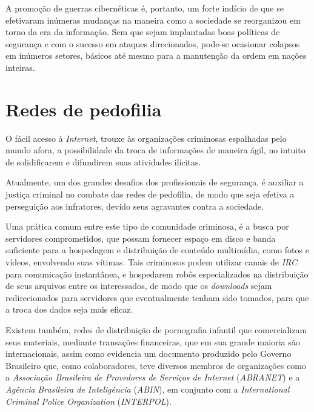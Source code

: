 A promoção de guerras cibernéticas é, portanto, um forte indício de que se efetivaram inúmeras mudanças na maneira como a sociedade se reorganizou em torno da era da informação. Sem que sejam implantadas boas políticas de segurança e com o sucesso em ataques direcionados, pode-se ocasionar colapsos em inúmeros setores, básicos até mesmo para a manutenção da ordem em nações inteiras.


\section{Redes de pedofilia}

O fácil acesso à \textit{Internet}, trouxe às organizações criminosas espalhadas pelo mundo afora, a possibilidade da troca de informações de maneira ágil, no intuito de solidificarem e difundirem suas atividades ilícitas.

Atualmente, um dos grandes desafios dos profissionais de segurança, é auxiliar a justiça criminal no combate das redes de pedofilia, de modo que seja efetiva a perseguição aos infratores, devido seus agravantes contra a sociedade.

Uma prática comum entre este tipo de comunidade criminosa, é a busca por servidores comprometidos, que possam fornecer espaço em disco e banda suficiente para a hospedagem e distribuição de conteúdo multimídia, como fotos e vídeos, envolvendo suas vítimas. Tais criminosos podem utilizar canais de \textit{IRC} para comunicação instantânea, e hospedarem robôs especializados na distribuição de seus arquivos entre os interessados, de modo que os \textit{downloads} sejam redirecionados para servidores que eventualmente tenham sido tomados, para que a troca dos dados seja mais eficaz.

Existem também, redes de distribuição de pornografia infantil que comercializam seus materiais, mediante transações financeiras, que em sua grande maioria são internacionais, assim como evidencia um documento \cite{PESPORINT} produzido pelo Governo Brasileiro que, como colaboradores, teve diversos membros de organizações como a \textit{Associação Brasileira de Provedores de Serviços de Internet} (\textit{ABRANET}) e a \textit{Agência Brasileira de Inteligência} (\textit{ABIN}), em conjunto com a \textit{International Criminal Police Organization} (\textit{INTERPOL}).


